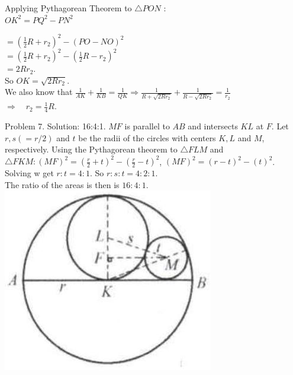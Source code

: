 \documentclass[10pt]{article}
\begin{document}
Applying Pythagorean Theorem to \(\triangle P O N\) :\\
\(O K^{2}=P Q^{2}-P N^{2}\)


\(=\left(\frac{1}{2} R+r_{2}\right)^{2}-(P O-N O)^{2}\)\\
\(=\left(\frac{1}{2} R+r_{2}\right)^{2}-\left(\frac{1}{2} R-r_{2}\right)^{2}\)\\
\(=2 R r_{2}\).\\
So \(O K=\sqrt{2 R r_{2}}\).\\
We also know that \(\frac{1}{A K}+\frac{1}{K B}=\frac{1}{Q K} \Rightarrow \frac{1}{R+\sqrt{2 R r_{2}}}+\frac{1}{R-\sqrt{2 R r_{2}}}=\frac{1}{r_{2}}\)\\
\(\Rightarrow \quad r_{2}=\frac{1}{4} R\).

Problem 7. Solution: 16:4:1.
\(M F\) is parallel to \(A B\) and intersects \(K L\) at \(F\). Let \(r, s(=r / 2)\) and \(t\) be the radii of the circles with centers \(K, L\) and \(M\), respectively. Using the Pythagorean theorem to \(\triangle F L M\) and \(\triangle F K M:(M F)^{2}=\left(\frac{r}{2}+t\right)^{2}-\left(\frac{r}{2}-t\right)^{2}\), \((M F)^{2}=(r-t)^{2}-(t)^{2}\).\\
Solving w get \(r: t=4: 1\). So \(r: s: t=4: 2: 1\).\\
The ratio of the areas is then is \(16: 4: 1\).\\
\includegraphics[max width=\textwidth, center]{2025_04_17_97bc1f7e44d93c271a88g-189}
\end{document}
